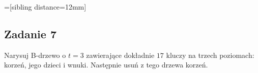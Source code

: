 \documentclass{article}
\begin{document}
=[sibling distance=12mm]
\begin{center}
    \quad
    \quad
\end{center}

\pagebreak
\subsection*{Zadanie 7}
Narysuj B-drzewo o $t=3$ zawierające dokładnie $17$ kluczy na trzech poziomach: korzeń, jego dzieci i wnuki. Następnie
usuń z tego drzewa korzeń.
\end{document}
